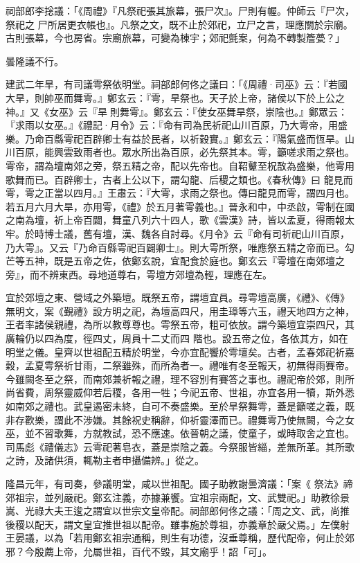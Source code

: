\begin{pinyinscope}
 祠部郎李捴議：「《周禮》『凡祭祀張其旅幕，張尸次』。尸則有幄。仲師云『尸次，祭祀之
 尸所居更衣帳也』。凡祭之文，既不止於郊祀，立尸之言，理應關於宗廟。古則張幕，今也房省。宗廟旅幕，可變為棟宇；郊祀氈案，何為不轉製簷甍？」



 曇隆議不行。



 建武二年旱，有司議雩祭依明堂。祠部郎何佟之議曰：「《周禮·司巫》云：『若國大旱，則帥巫而舞雩。』鄭玄云：『雩，旱祭也。天子於上帝，諸侯以下於上公之神。』又《女巫》云『旱則舞雩』。鄭玄云：『使女巫舞旱祭，崇陰也。』鄭眾云：『求雨以女巫。』《禮記·月令》云：『命有司為民祈祀山川百原，乃大雩帝，用盛樂。乃命百縣雩祀百辟卿士有益於民者，以祈穀實。』鄭玄云：『陽氣盛而恆旱。山川百原，能興雲致雨者也。眾水所出為百原，必先祭其本。雩，籲嗟求雨之祭也。雩帝，謂為壇南郊之旁，祭五精之帝，配以先帝也。自鞀鼙至柷敔為盛樂，他雩用歌舞而已。百辟卿士，古者上公以下，謂勾龍、后稷之類也。《春秋傳》曰
 龍見而雩，雩之正當以四月。』王肅云：『大雩，求雨之祭也。傳曰龍見而雩，謂四月也。若五月六月大旱，亦用雩，《禮》於五月著雩義也。』晉永和中，中丞啟，雩制在國之南為壇，祈上帝百闢，舞童八列六十四人，歌《雲漢》詩，皆以孟夏，得雨報太牢。於時博士議，舊有壇，漢、魏各自討尋。《月令》云『命有司祈祀山川百原，乃大雩』。又云『乃命百縣雩祀百闢卿士』。則大雩所祭，唯應祭五精之帝而已。勾芒等五神，既是五帝之佐，依鄭玄說，宜配食於庭也。鄭玄云『雩壇在南郊壇之旁』，而不辨東西。尋地道尊右，雩壇方郊壇為輕，理應在左。



 宜於郊壇之東、營域之外築壇。既祭五帝，謂壇宜員。尋雩壇高廣，《禮》、《傳》無明文，案《覲禮》設方明之祀，為壇高四尺，用圭璋等六玉，禮天地四方之神，王者率諸侯親禮，為所以教尊尊也。雩祭五帝，粗可依放。謂今築壇宜崇四尺，其廣輪仍以四為度，徑四丈，周員十二丈而四
 階也。設五帝之位，各依其方，如在明堂之儀。皇齊以世祖配五精於明堂，今亦宜配饗於雩壇矣。古者，孟春郊祀祈嘉穀，孟夏雩祭祈甘雨，二祭雖殊，而所為者一。禮唯有冬至報天，初無得雨賽帝。今雖闕冬至之祭，而南郊兼祈報之禮，理不容別有賽答之事也。禮祀帝於郊，則所尚省費，周祭靈威仰若后稷，各用一牲；今祀五帝、世祖，亦宜各用一犢，斯外悉如南郊之禮也。武皇遏密未終，自可不奏盛樂。至於旱祭舞雩，蓋是籲嗟之義，既非存歡樂，謂此不涉嫌。其餘祝史稱辭，仰祈靈澤而已。禮舞雩乃使無闕，今之女巫，並不習歌舞，方就教試，恐不應速。依晉朝之議，使童子，或時取舍之宜也。司馬彪《禮儀志》云雩祀著皂衣，蓋是崇陰之義。今祭服皆緇，差無所革。其所歌之詩，及諸供須，輒勒主者申攝備辨。」從之。



 隆昌元年，有司奏，參議明堂，咸以世祖配。國子助教謝曇濟議：「案《
 祭法》禘郊祖宗，並列嚴祀。鄭玄注義，亦據兼饗。宜祖宗兩配，文、武雙祀。」助教徐景嵩、光祿大夫王逡之謂宜以世宗文皇帝配。祠部郎何佟之議：「周之文、武，尚推後稷以配天，謂文皇宜推世祖以配帝。雖事施於尊祖，亦義章於嚴父焉。」左僕射王晏議，以為「若用鄭玄祖宗通稱，則生有功德，沒垂尊稱，歷代配帝，何止於郊邪？今殷薦上帝，允屬世祖，百代不毀，其文廟乎！詔「可」。




\end{pinyinscope}
